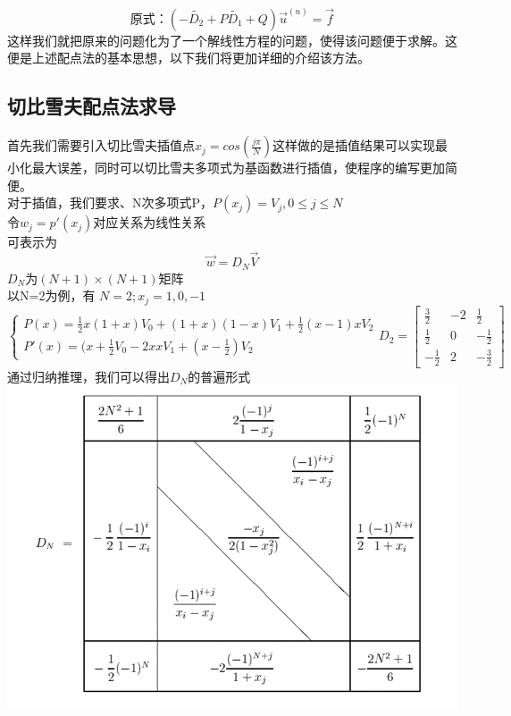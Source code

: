 \documentclass[12pt]{ctexart}
\numberwithin{equation}{section} %
\begin{document}
$$\text{原式：}(-\widetilde{D_2}+P\widetilde{D_1}+Q)\Vec{u}^{(n)}=\Vec{f}$$
这样我们就把原来的问题化为了一个解线性方程的问题，使得该问题便于求解。这便是上述配点法的基本思想，以下我们将更加详细的介绍该方法。
\subsection{切比雪夫配点法求导}
首先我们需要引入切比雪夫插值点$x_j=cos(\frac{j\pi}{N})$这样做的是插值结果可以实现最小化最大误差，同时可以切比雪夫多项式为基函数进行插值，使程序的编写更加简便。\\
对于插值，我们要求、N次多项式P，$P(x_j)=V_j,0\le j\le N$\\
令$w_j=p\prime(x_j)$对应关系为线性关系\\
可表示为
\begin{equation}\label{zn8}
    \Vec{w}=D_N\Vec{V}
\end{equation}
$D_N$为$(N+1)\times (N+1)$矩阵\\
以N=2为例，有
$N=2;x_j=1,0,-1$\\
    $$\begin{cases}
       P(x)=\frac{1}{2}x(1+x)V_0+(1+x)(1-x)V_1+\frac{1}{2}(x-1)xV_2\\
       P\prime(x)=(x+\frac{1}{2}V_0-2xxV_1+(x-\frac{1}{2})V_2
   \end{cases}
   D_2=
   \begin{bmatrix}
       \frac{3}{2}&-2&\frac{1}{2}\\
       \frac{1}{2}&0&-\frac{1}{2}\\
       -\frac{1}{2}&2&-\frac{3}{2}
   \end{bmatrix}$$
   通过归纳推理，我们可以得出$D_N$的普遍形式\\
   \includegraphics[width=1\textwidth]{矩阵图.png}\\
\end{document}
